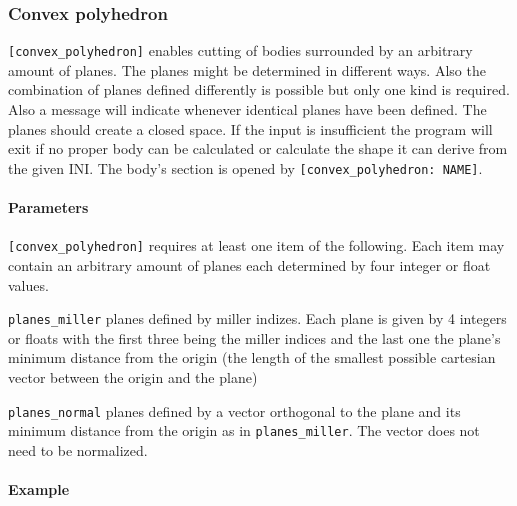 \subsubsection{Convex polyhedron}

\lstinline{[convex_polyhedron]} enables cutting of bodies surrounded by an arbitrary amount of planes. The planes might be determined in different ways. Also the combination of planes defined differently is possible but only one kind is required. Also a message will indicate whenever identical planes have been defined. The planes should create a closed space. If the input is insufficient the program will exit if no proper body can be calculated or calculate the shape it can derive from the given INI.
The body's section is opened by \lstinline{[convex_polyhedron: NAME]}.

\paragraph{Parameters}
\lstinline{[convex_polyhedron]} requires at least one item of the following. Each item may contain an arbitrary amount of planes each determined by four integer or float values.
\begin{description}
 \item{\lstinline{planes_miller}} planes defined by miller indizes. Each plane is given by 4 integers or floats with the first three being the miller indices and the last one the plane's minimum distance from the origin (the length of the smallest possible cartesian vector between the origin and the plane)
 \item{\lstinline{planes_normal}} planes defined by a vector orthogonal to the plane and its minimum distance from the origin as in \lstinline{planes_miller}. The vector does not need to be normalized.
\end{description} 

\paragraph{Example}\

